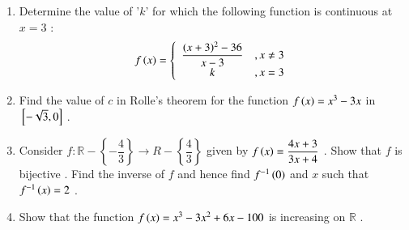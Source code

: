 \begin{enumerate}
\item Determine the value of '$k$' for which the following function is continuous at $x=3$ :
\begin{align*}f\left(x\right)=\left\{\begin{array}{cc}\dfrac{(x+3)^2-36}{x-3} & , x \neq 3 \\k & , x=3\end{array}\right.  
\end{align*}
\item Find the value of $c$ in Rolle's theorem for the function $f\left(x\right)=x^3-3x$ in ${}\left[-\sqrt{3}, 0\right]$ .
\item Consider $f: \mathbb{R} -\left\{-\dfrac{4}{3}\right\}   \rightarrow R - \left\{\dfrac{4}{3}\right\}$ given by $f\left(x\right) = \dfrac{4x + 3}{3x + 4}$ . Show that $f$ is bijective . Find the inverse of $f$ and hence find $f^{-1}\left(0\right)$ and $x$ such that $f^{-1}\left(x\right) = 2$ .
\item Show that the function $f\left(x\right) = x^3-3x^2+6x-100$ is increasing on $\mathbb{R}$ .
\end{enumerate}
